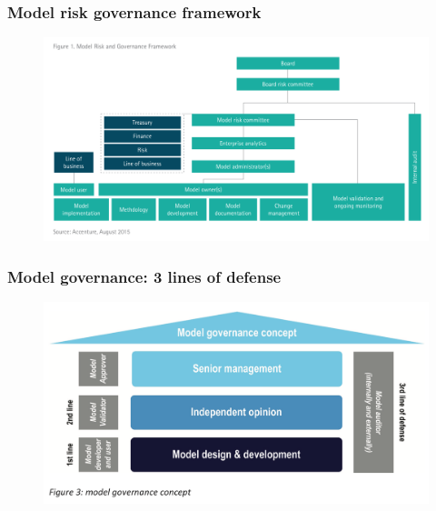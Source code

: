 \documentclass[11pt]{beamer}
\begin{document}
\begin{frame}
\frametitle{Model risk governance framework}
\begin{figure}[h]
	\centering
	\includegraphics[scale=.35]{images/model_risk_gov_framework}
\end{figure}
\end{frame}


\begin{frame}
\frametitle{Model governance: 3 lines of defense}
\begin{figure}[h]
\centering
\includegraphics[scale=.3]{images/3_lines_of_defense}
\end{figure}
\end{frame}

%
%
%
\end{document}
